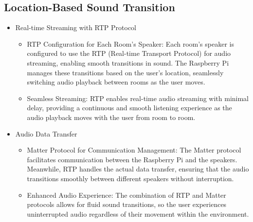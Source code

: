 \documentclass[conference]{IEEEtran}
\begin{document}
\subsection{Location-Based Sound Transition}
\begin{itemize}
    \item Real-time Streaming with RTP Protocol
\begin{itemize}
    \item RTP Configuration for Each Room’s Speaker: Each room’s speaker is configured to use the RTP (Real-time Transport Protocol) for audio streaming, enabling smooth transitions in sound. The Raspberry Pi manages these transitions based on the user’s location, seamlessly switching audio playback between rooms as the user moves.\\
    \item Seamless Streaming: RTP enables real-time audio streaming with minimal delay, providing a continuous and smooth listening experience as the audio playback moves with the user from room to room.\\
\end{itemize}
\end{itemize}
\begin{itemize}
    \item Audio Data Transfer
\begin{itemize}
    \item Matter Protocol for Communication Management: The Matter protocol facilitates communication between the Raspberry Pi and the speakers. Meanwhile, RTP handles the actual data transfer, ensuring that the audio transitions smoothly between different speakers without interruption.\\
    \item Enhanced Audio Experience: The combination of RTP and Matter protocols allows for fluid sound transitions, so the user experiences uninterrupted audio regardless of their movement within the environment.\\
\end{itemize}
\end{itemize}
\end{document}
